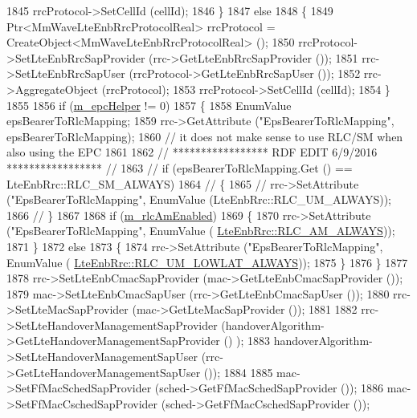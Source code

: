 \begin{DoxyCode}
1845           rrcProtocol->SetCellId (cellId);
1846         \}
1847         \textcolor{keywordflow}{else}
1848         \{
1849           Ptr<MmWaveLteEnbRrcProtocolReal> rrcProtocol = CreateObject<MmWaveLteEnbRrcProtocolReal> ();
1850           rrcProtocol->SetLteEnbRrcSapProvider (rrc->GetLteEnbRrcSapProvider ());
1851           rrc->SetLteEnbRrcSapUser (rrcProtocol->GetLteEnbRrcSapUser ());
1852           rrc->AggregateObject (rrcProtocol);
1853           rrcProtocol->SetCellId (cellId);
1854         \}
1855 
1856         \textcolor{keywordflow}{if} (\hyperlink{classns3_1_1MmWaveHelper_a03b33f9a2480a4cdd8ffe697ccc08e9e}{m\_epcHelper} != 0)
1857         \{
1858           EnumValue epsBearerToRlcMapping;
1859           rrc->GetAttribute (\textcolor{stringliteral}{"EpsBearerToRlcMapping"}, epsBearerToRlcMapping);
1860           \textcolor{comment}{// it does not make sense to use RLC/SM when also using the EPC}
1861 
1862 \textcolor{comment}{// ***************** RDF EDIT 6/9/2016 ***************** //}
1863 \textcolor{comment}{//        if (epsBearerToRlcMapping.Get () == LteEnbRrc::RLC\_SM\_ALWAYS)}
1864 \textcolor{comment}{//          \{}
1865 \textcolor{comment}{//            rrc->SetAttribute ("EpsBearerToRlcMapping", EnumValue (LteEnbRrc::RLC\_UM\_ALWAYS));}
1866 \textcolor{comment}{//          \}}
1867 
1868     \textcolor{keywordflow}{if} (\hyperlink{classns3_1_1MmWaveHelper_a47e5d8166922f0be28d1e29e18d2e1f9}{m\_rlcAmEnabled})
1869       \{
1870         rrc->SetAttribute (\textcolor{stringliteral}{"EpsBearerToRlcMapping"}, EnumValue (
      \hyperlink{classns3_1_1LteEnbRrc_a1c748bf2d69860b866dfda2a38427842a3cdf85c3ca2f87b1775fde37d95d0ace}{LteEnbRrc::RLC\_AM\_ALWAYS}));
1871       \}
1872       \textcolor{keywordflow}{else}
1873       \{
1874         rrc->SetAttribute (\textcolor{stringliteral}{"EpsBearerToRlcMapping"}, EnumValue (
      \hyperlink{classns3_1_1LteEnbRrc_a1c748bf2d69860b866dfda2a38427842a57f0cbeb7cbaf285166a276e0572c8f4}{LteEnbRrc::RLC\_UM\_LOWLAT\_ALWAYS}));
1875       \}
1876         \}
1877 
1878         rrc->SetLteEnbCmacSapProvider (mac->GetLteEnbCmacSapProvider ());
1879         mac->SetLteEnbCmacSapUser (rrc->GetLteEnbCmacSapUser ());
1880         rrc->SetLteMacSapProvider (mac->GetLteMacSapProvider ());
1881 
1882         rrc->SetLteHandoverManagementSapProvider (handoverAlgorithm->GetLteHandoverManagementSapProvider ()
      );
1883         handoverAlgorithm->SetLteHandoverManagementSapUser (rrc->GetLteHandoverManagementSapUser ());
1884 
1885         mac->SetFfMacSchedSapProvider (sched->GetFfMacSchedSapProvider ());
1886         mac->SetFfMacCschedSapProvider (sched->GetFfMacCschedSapProvider ());

\end{DoxyCode}
